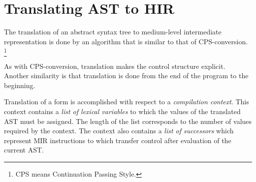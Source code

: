 \chapter{Translating AST to HIR}
\label{chap-translating-ast-to-hir}

The translation of an abstract syntax tree
 to medium-level intermediate
representation  is done by an algorithm that is
similar to that of CPS-conversion.%
\footnote{CPS means Continuation Passing Style.}

As with CPS-conversion, translation makes the control structure
explicit.  Another similarity is that translation is done from the end
of the program to the beginning.

Translation of a form is accomplished with respect to a
\emph{compilation context}.  This context contains a \emph{list of
  lexical variables} to which the values of the translated AST must be
assigned.  The length of the list corresponds to the number of values
required by the context.  The context also contains a \emph{list of
  successors} which represent MIR instructions to which transfer
control after evaluation of the current AST.
